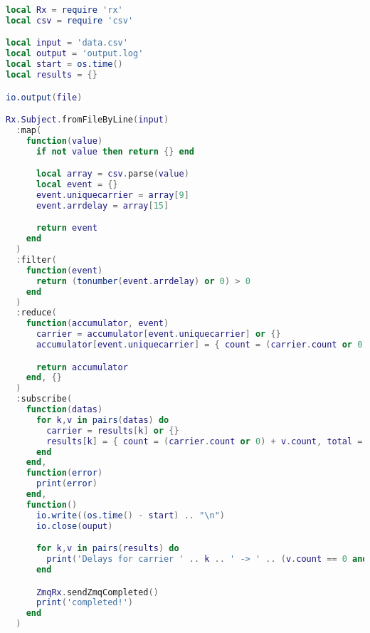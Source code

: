 \begin{lstlisting}[language=LUA,caption={Example of process pipeline with RxLua.},label=rx-processing-pipeline-example]
local Rx = require 'rx'
local csv = require 'csv'

local input = 'data.csv'
local output = 'output.log'
local start = os.time()
local results = {}

io.output(file)

Rx.Subject.fromFileByLine(input)
  :map(
    function(value)
      if not value then return {} end

      local array = csv.parse(value)
      local event = {}
      event.uniquecarrier = array[9]
      event.arrdelay = array[15]

      return event
    end
  )
  :filter(
    function(event)
      return (tonumber(event.arrdelay) or 0) > 0
    end
  )
  :reduce(
    function(accumulator, event)
      carrier = accumulator[event.uniquecarrier] or {}
      accumulator[event.uniquecarrier] = { count = (carrier.count or 0) + 1, total = (carrier.total or 0) + event.arrdelay }

      return accumulator
    end, {}
  )
  :subscribe(
    function(datas)
      for k,v in pairs(datas) do
        carrier = results[k] or {}
        results[k] = { count = (carrier.count or 0) + v.count, total = (carrier.total or 0) + v.total }
      end
    end,
    function(error)
      print(error)
    end,
    function()
      io.write((os.time() - start) .. "\n")
      io.close(ouput)

      for k,v in pairs(results) do
        print('Delays for carrier ' .. k .. ' -> ' .. (v.count == 0 and 0 or (v.total / v.count)) .. ' average mins - ' .. math.tointeger(v.count) .. " delayed flights")
      end

      ZmqRx.sendZmqCompleted()
      print('completed!')
    end
  )
\end{lstlisting}
